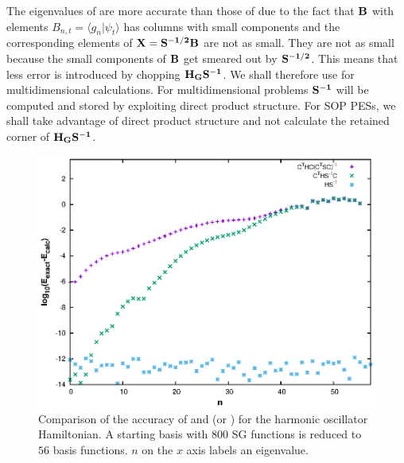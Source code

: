  The eigenvalues of   are more accurate than those of   due to the fact that 
${\bf{    B   }} $ with elements  
 $B _{n,t} = \langle g_n \vert \psi_t \rangle $  has columns with small components and   the 
 corresponding elements of 
  ${\bf{   X = S^{-1/2}  B   }} $  are not as small.  They are not as small  because   the small components of   ${\bf{    B   }} $   get smeared out
 by  ${\bf{  S^{-1/2}       }} $.   This means that 
less error is introduced by chopping    ${\bf{     H_G  S^{-1}    }} $. 
We shall therefore use    for multidimensional calculations.   For multidimensional problems 
 $ {\bf{    S^{-1} }} $ will be  computed and stored by exploiting  direct product
structure.  For SOP PESs,  we  shall take advantage of direct product structure and not calculate  the  retained corner of $ {\bf{       H_G   S^{-1}         }} $.   



%
%
\begin{figure}[t]
\includegraphics[width=6.5in]{./JCP2/fig2.eps}
\caption[Comparison of different asymmetric chopping schemes for the harmonic oscillator]{Comparison of  the accuracy of  and  (or )  for the 
harmonic oscillator Hamiltonian.   A  starting basis with  $800$ SG functions is reduced to $56$ 
basis functions. $n$ on the $x$ axis labels an eigenvalue.    \label{Fig.ddoneE}}
\end{figure}





